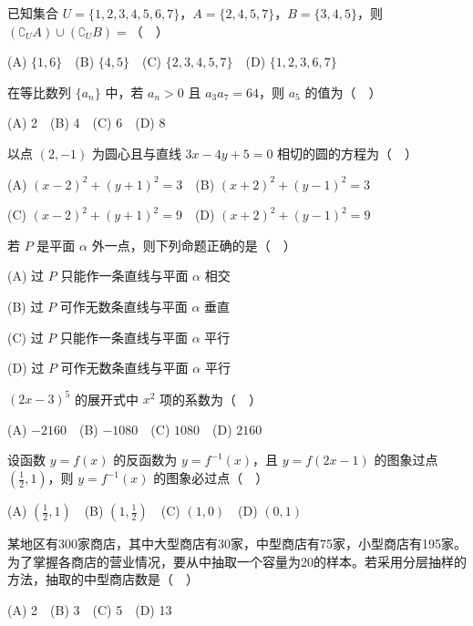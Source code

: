\begin{question}
已知集合 \(U=\{1,2,3,4,5,6,7\}\)，\(A=\{2,4,5,7\}\)，\(B=\{3,4,5\}\)，则 \((\complement_U A)\cup(\complement_U B)=\)（　）

(A) \(\{1,6\}\)　(B) \(\{4,5\}\)　(C) \(\{2,3,4,5,7\}\)　(D) \(\{1,2,3,6,7\}\)

\end{question}
\begin{question}
在等比数列 \(\{a_n\}\) 中，若 \(a_n>0\) 且 \(a_3a_7=64\)，则 \(a_5\) 的值为（　）

(A) 2　(B) 4　(C) 6　(D) 8

\end{question}
\begin{question}
以点 \((2,-1)\) 为圆心且与直线 \(3x-4y+5=0\) 相切的圆的方程为（　）

(A) \((x-2)^2+(y+1)^2=3\)　(B) \((x+2)^2+(y-1)^2=3\)

(C) \((x-2)^2+(y+1)^2=9\)　(D) \((x+2)^2+(y-1)^2=9\)

\end{question}
\begin{question}
若 \(P\) 是平面 \(\alpha\) 外一点，则下列命题正确的是（　）

(A) 过 \(P\) 只能作一条直线与平面 \(\alpha\) 相交

(B) 过 \(P\) 可作无数条直线与平面 \(\alpha\) 垂直

(C) 过 \(P\) 只能作一条直线与平面 \(\alpha\) 平行

(D) 过 \(P\) 可作无数条直线与平面 \(\alpha\) 平行

\end{question}
\begin{question}
\((2x-3)^5\) 的展开式中 \(x^2\) 项的系数为（　）

(A) \(-2160\)　(B) \(-1080\)　(C) \(1080\)　(D) \(2160\)

\end{question}
\begin{question}
设函数 \(y=f(x)\) 的反函数为 \(y=f^{-1}(x)\)，且 \(y=f(2x-1)\) 的图象过点 \(\left(\frac12,1\right)\)，则 \(y=f^{-1}(x)\) 的图象必过点（　）

(A) \(\left(\frac12,1\right)\)　(B) \(\left(1,\frac12\right)\)　(C) \((1,0)\)　(D) \((0,1)\)

\end{question}
\begin{question}
某地区有300家商店，其中大型商店有30家，中型商店有75家，小型商店有195家。为了掌握各商店的营业情况，要从中抽取一个容量为20的样本。若采用分层抽样的方法，抽取的中型商店数是（　）

(A) 2　(B) 3　(C) 5　(D) 13

\end{question}
